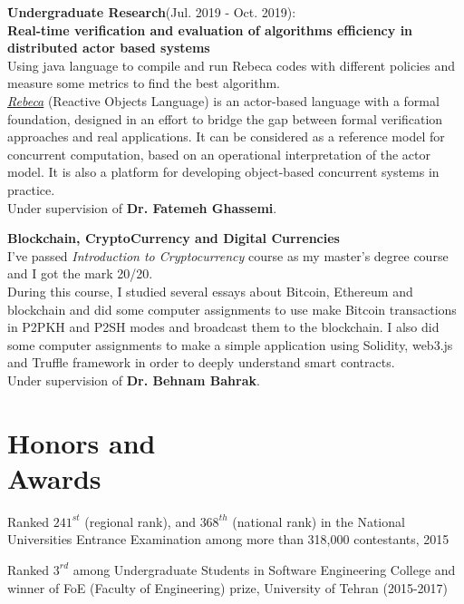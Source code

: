 \documentclass[line, mm]{sampleCV}
\begin{document}
\begin{resume}
\begin{list2}
	\item \textbf{َUndergraduate Research}(Jul. 2019 - Oct. 2019): \\
	\textbf{Real-time verification and evaluation of algorithms efficiency in distributed actor based systems}\\
	Using java language to compile and run Rebeca codes with different policies and measure some metrics to find the best algorithm.\\
	\href{http://rebeca-lang.org/}{\textit{Rebeca}} (Reactive Objects Language) is an actor-based language with a formal foundation, designed in an effort to bridge the gap between formal verification approaches and real applications. It can be considered as a reference model for concurrent computation, based on an operational interpretation of the actor model. It is also a platform for developing object-based concurrent systems in practice.\\
	Under supervision of \textbf{Dr. Fatemeh Ghassemi}.
	\\
	\item \textbf{Blockchain, CryptoCurrency and Digital Currencies}	\\
	I've passed \textit{Introduction to Cryptocurrency} course as my master's degree course and I got the mark 20/20. \\ 
	During this course, I studied several essays about Bitcoin, Ethereum and blockchain and did some computer assignments to use make Bitcoin transactions in P2PKH and P2SH modes and broadcast them to the blockchain.
	I also did some computer assignments to make a simple application using Solidity,  web3.js and Truffle framework in order to deeply understand smart contracts.\\
	Under supervision of \textbf{Dr. Behnam Bahrak}.
\end{list2}



\section{\mysidestyle Honors and\\Awards} 
\begin{list2}
\item Ranked $241^{st}$ (regional rank), and $368^{th}$ (national rank) in the National Universities Entrance Examination among more than 318,000 contestants, 2015
\item Ranked $3^{rd}$ among Undergraduate Students in Software Engineering College and winner of FoE (Faculty of Engineering) prize, University of Tehran (2015-2017)
\end{list2}



\end{resume}
\end{document}
